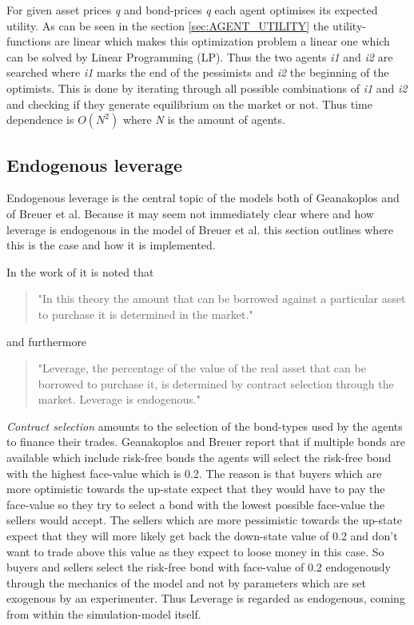 \documentclass[../Bachelorarbeit.tex]{subfiles}
\begin{document}
\medskip

For given asset prices \textit{q} and bond-prices \textit{q} each agent optimises its expected utility. As can be seen in the section \ref{sec:AGENT_UTILITY} the utility-functions are linear which makes this optimization problem a linear one which can be solved by Linear Programming (LP). Thus the two agents \textit{i1} and \textit{i2} are searched where \textit{i1} marks the end of the pessimists and \textit{i2} the beginning of the optimists. This is done by iterating through all possible combinations of \textit{i1} and \textit{i2} and checking if they generate equilibrium on the market or not. Thus time dependence is $O(N^2)$ where \textit{N} is the amount of agents. 

\subsection{Endogenous leverage}
Endogenous leverage is the central topic of the models both of Geanakoplos and of Breuer et al. Because it may seem not immediately clear where and how leverage is endogenous in the model of Breuer et al. this section outlines where this is the case and how it is implemented. 

\medskip
In the work of \cite{Breuer2015} it is noted that 
\begin{quote}
"In this theory the amount that can be borrowed against a particular asset to purchase it is determined in the market."
\end{quote}

and furthermore

\begin{quote}
"Leverage, the percentage of the value of the real asset that can be borrowed to purchase it, is determined by contract selection through the market. Leverage is endogenous."
\end{quote}

\textit{Contract selection} amounts to the selection of the bond-types used by the agents to finance their trades. Geanakoplos and Breuer report that if multiple bonds are available which include risk-free bonds the agents will select the risk-free bond with the highest face-value which is 0.2. The reason is that buyers which are more optimistic towards the up-state expect that they would have to pay the face-value so they try to select a bond with the lowest possible face-value the sellers would accept. The sellers which are more pessimistic towards the up-state expect that they will more likely get back the down-state value of 0.2 and don't want to trade above this value as they expect to loose money in this case. So buyers and sellers select the risk-free bond with face-value of 0.2 endogenously through the mechanics of the model and not by parameters which are set exogenous by an experimenter. Thus Leverage is regarded as endogenous, coming from within the simulation-model itself.
\end{document}
